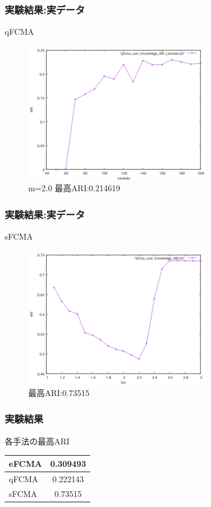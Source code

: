 \documentclass[13pt,dvipdfmx]{beamer}
\begin{document}
\begin{frame}\frametitle{実験結果:実データ}
  \begin{block}{qFCMA}
   \begin{figure}[htbp]
    \begin{center}
    \includegraphics[height=60mm]{qfcma_ARI_Lambda.png}
   \end{center}
   \captionsetup{labelformat=empty,labelsep=none}
   \caption{m=2.0 最高ARI:0.214619}
  \end{figure}
 \end{block}
\end{frame}

\begin{frame}\frametitle{実験結果:実データ}
  \begin{block}{sFCMA}
   \begin{figure}[htbp]
    \begin{center}
    \includegraphics[height=60mm]{sfcma_ARI.png}
   \end{center}
   \captionsetup{labelformat=empty,labelsep=none}
   \caption{最高ARI:0.73515}
  \end{figure}
 \end{block}
\end{frame}

\begin{frame}\frametitle{実験結果}
\begin{block}{各手法の最高ARI}
\vspace{5mm}
  \begin{table}[htb]
   \begin{tabular}{ l | c }\hline
     eFCMA & 0.309493 \\ \hline  
     qFCMA & 0.222143\\  \hline
     sFCMA & 0.73515\\ \hline
   \end{tabular}
  \end{table}
 \end{block}
\end{frame}
\end{document}

